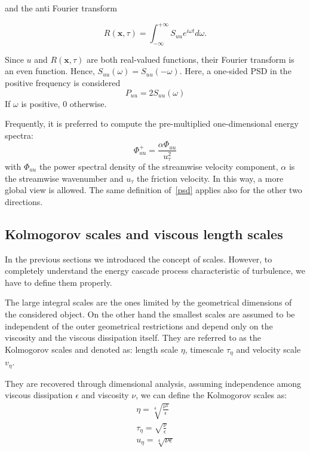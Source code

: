 and the anti Fourier transform

\begin{equation*}
R(\mathbf{x},\tau) = \int_{-\infty}^{+\infty} S_{uu} e^{i\omega t} d \omega.
\end{equation*}
\par
Since $u$ and $R(\mathbf{x},\tau)$ are both real-valued functions, their Fourier transform is an even function. Hence, $S_{uu}(\omega) = S_{uu}(-\omega)$. Here, a one-sided PSD in the positive frequency is considered
\begin{equation*}
P_{uu} = 2 S_{uu}(\omega)
\end{equation*}
If $\omega$ is positive, 0 otherwise.
\par
Frequently, it is preferred to compute the pre-multiplied one-dimensional energy spectra:
\begin{equation}
\Phi_{uu}^{+} = \frac{\alpha \Phi_{uu}}{u_{\tau}^{2}}
\label{psd}
\end{equation}
with $\Phi_{uu}$ the power spectral density of the streamwise velocity component, $\alpha$ is the streamwise wavenumber and $u_{\tau}$ the friction velocity. In this way, a more global view is allowed.
The same definition of~\ref{psd} applies also for the other two directions.




\subsection{Kolmogorov scales and viscous length scales}
In the previous sections we introduced the concept of scales. However, to completely understand the energy cascade process characteristic of turbulence, we have to define them properly.
\par
The large integral scales are the ones limited by the geometrical dimensions of the considered object. On the other hand the smallest scales are assumed to be independent of the outer geometrical restrictions and depend only on the viscosity and the viscous dissipation itself. They are referred to as the Kolmogorov scales and denoted as: length scale $\eta$, timescale $\tau_{\eta}$ and velocity scale $v_{\eta}$. 
\par
They are recovered through dimensional analysis, assuming independence among viscous dissipation $\epsilon$ and viscosity $\nu$, we can define the Kolmogorov scales as:
\begin{subequations}
\begin{align}
\eta = \sqrt[4]{ \frac{\nu^{3}}{\epsilon} }\\
\tau_{\eta} =\sqrt{ \frac{\nu}{\epsilon}}\\
u_{\eta} = \sqrt[4]{\nu \epsilon }
\end{align}
\end{subequations}


